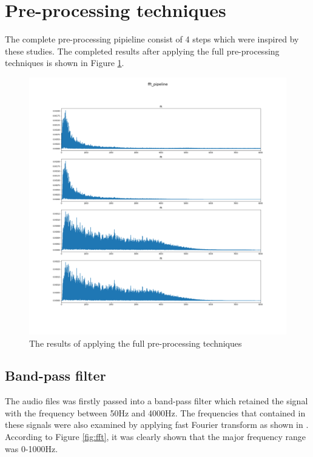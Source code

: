 \section{Pre-processing techniques}
The complete pre-processing pipieline consist of 4 steps which were inspired by these studies.\cite{Lei2014Content-basedFeatures}\cite{Niu2019AState}\cite{Ren2015Fine-grainedSmartphones} The completed results after applying the full pre-processing techniques is shown in Figure \ref{fig:fft_pipeline}.
\begin{figure}[h]
    \centerline{\includegraphics[scale=0.25]{figures/fft_pipeline.png}}
    \caption{The results of applying the full pre-processing techniques}
    \label{fig:fft_pipeline}
\end{figure}

\subsection{Band-pass filter}
The audio files was firstly passed into a band-pass filter which retained the signal with the frequency between 50Hz and 4000Hz. The frequencies that contained in these signals were also examined by applying fast Fourier transform as shown in . According to Figure \ref{fig:fft}, it was clearly shown that the major frequency range was 0-1000Hz.

